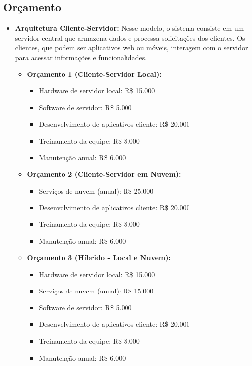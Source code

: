 	       \subsection{Or\c{c}amento }
	\begin{itemize}
		\item \textbf{Arquitetura Cliente-Servidor:} Nesse modelo, o sistema consiste em um servidor central que armazena dados e processa solicitações dos clientes. Os clientes, que podem ser aplicativos web ou móveis, interagem com o servidor para acessar informações e funcionalidades.
		
		\begin{itemize}
			\item \textbf{Orçamento 1 (Cliente-Servidor Local):}
			\begin{itemize}
				\item Hardware de servidor local: R\$ 15.000
				\item Software de servidor: R\$ 5.000
				\item Desenvolvimento de aplicativos cliente: R\$ 20.000
				\item Treinamento da equipe: R\$ 8.000
				\item Manutenção anual: R\$ 6.000
			\end{itemize}
			\item \textbf{Orçamento 2 (Cliente-Servidor em Nuvem):}
			\begin{itemize}
				\item Serviços de nuvem (anual): R\$ 25.000
				\item Desenvolvimento de aplicativos cliente: R\$ 20.000
				\item Treinamento da equipe: R\$ 8.000
				\item Manutenção anual: R\$ 6.000
			\end{itemize}
			\item \textbf{Orçamento 3 (Híbrido - Local e Nuvem):}
			\begin{itemize}
				\item Hardware de servidor local: R\$ 15.000
				\item Serviços de nuvem (anual): R\$ 15.000
				\item Software de servidor: R\$ 5.000
				\item Desenvolvimento de aplicativos cliente: R\$ 20.000
				\item Treinamento da equipe: R\$ 8.000
				\item Manutenção anual: R\$ 6.000
			\end{itemize}
		\end{itemize}
		

\end{itemize}
